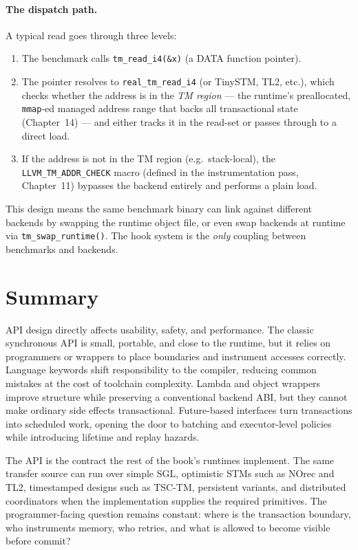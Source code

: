 \paragraph{The dispatch path.}
A typical read goes through three levels:

\begin{enumerate}
  \item The benchmark calls \texttt{tm\_read\_i4(\&x)} (a DATA function
        pointer).
  \item The pointer resolves to \texttt{real\_tm\_read\_i4} (or TinySTM,
        TL2, etc.), which checks whether the address is in the \emph{TM
        region} --- the runtime's preallocated, \texttt{mmap}-ed managed
        address range that backs all transactional state (Chapter~14) ---
        and either tracks it in the read-set or passes through to a
        direct load.
  \item If the address is not in the TM region (e.g.\ stack-local), the
        \texttt{LLVM\_TM\_ADDR\_CHECK} macro (defined in the
        instrumentation pass, Chapter~11) bypasses the backend
        entirely and performs a plain load.
\end{enumerate}

\noindent
This design means the same benchmark binary can link against different
backends by swapping the runtime object file, or even swap backends at
runtime via \texttt{tm\_swap\_runtime()}.  The hook system is the
\emph{only} coupling between benchmarks and backends.

\section{Summary}

API design directly affects usability, safety, and performance. The classic synchronous API is small, portable, and close to the runtime, but it relies on programmers or wrappers to place boundaries and instrument accesses correctly. Language keywords shift responsibility to the compiler, reducing common mistakes at the cost of toolchain complexity. Lambda and object wrappers improve structure while preserving a conventional backend ABI, but they cannot make ordinary side effects transactional. Future-based interfaces turn transactions into scheduled work, opening the door to batching and executor-level policies while introducing lifetime and replay hazards.

The API is the contract the rest of the book's runtimes implement. The same transfer source can run over simple SGL, optimistic STMs such as NOrec and TL2, timestamped designs such as TSC-TM, persistent variants, and distributed coordinators when the implementation supplies the required primitives. The programmer-facing question remains constant: where is the transaction boundary, who instruments memory, who retries, and what is allowed to become visible before commit?

